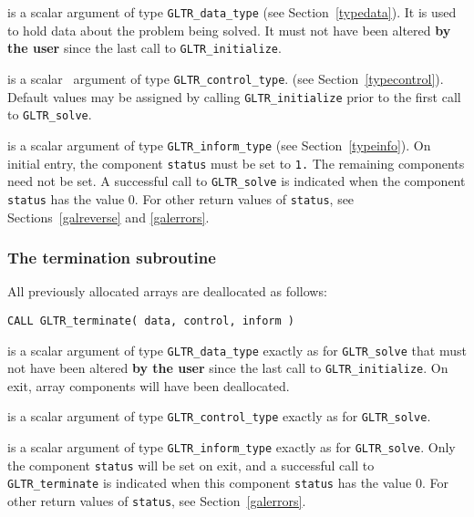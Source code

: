\documentclass{galahad}
\newcommand{\packagename}{GL\-TR}
\begin{document}
\begin{description}
 is a scalar \intentinout argument of type
{\tt \packagename\_data\_type}
(see Section~\ref{typedata}). It is used to hold data about the problem being
solved. It must not have been altered {\bf by the user} since the last call to
{\tt \packagename\_initialize}.

 is a scalar \intentin\ argument of type
{\tt \packagename\_control\_type}.
(see Section~\ref{typecontrol}).
Default values may be assigned by calling {\tt \packagename\_initialize}
prior to the first call to {\tt \packagename\_solve}.

 is a scalar \intentinout argument of type
{\tt \packagename\_inform\_type}
(see Section~\ref{typeinfo}).
On initial entry, the component {\tt status} must be set to {\tt 1.}
The remaining components need not be set.
A successful call to
{\tt \packagename\_solve}
is indicated when the  component {\tt status} has the value 0.
For other return values of {\tt status}, see Sections~\ref{galreverse}
and \ref{galerrors}.
\end{description}


\subsubsection{The  termination subroutine}
All previously allocated arrays are deallocated as follows:

\hskip0.5in
{\tt CALL \packagename\_terminate( data, control, inform )}

\begin{description}

 is a scalar \intentinout argument of type
{\tt \packagename\_data\_type}
exactly as for
{\tt \packagename\_solve}
that must not have been altered {\bf by the user} since the last call to
{\tt \packagename\_initialize}.
On exit, array components will have been deallocated.

 is a scalar \intentin argument of type
{\tt \packagename\_control\_type}
exactly as for
{\tt \packagename\_solve}.

 is a scalar \intentout argument of type
{\tt \packagename\_inform\_type}
exactly as for
{\tt \packagename\_solve}.
Only the component {\tt status} will be set on exit, and a
successful call to
{\tt \packagename\_terminate}
is indicated when this  component {\tt status} has the value 0.
For other return values of {\tt status}, see Section~\ref{galerrors}.

\end{description}
\end{document}
